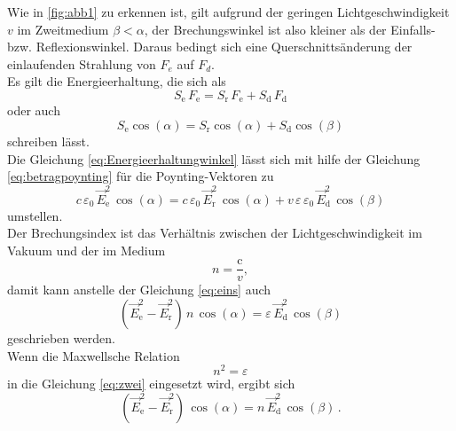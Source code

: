 Wie in \autoref{fig:abb1} zu erkennen ist, gilt aufgrund der geringen Lichtgeschwindigkeit $v$ im Zweitmedium $\beta < \alpha$, der Brechungswinkel ist also kleiner als der Einfalls- bzw. Reflexionswinkel.
Daraus bedingt sich eine Querschnittsänderung der einlaufenden Strahlung von $F_e$ auf $F_d$. \\

Es gilt die Energieerhaltung, die sich als
\begin{equation}
    S_{\text{e}} \, F_{\text{e}} = S_{\text{r}} \, F_{\text{e}} +  S_{\text{d}} \, F_{\text{d}}
    \label{eq:Energieerhaltung}
\end{equation}
oder auch 
\begin{equation}
    S_{\text{e}} \cos(\alpha) = S_{\text{r}} \cos(\alpha) +  S_{\text{d}} \cos(\beta)
    \label{eq:Energieerhaltungwinkel}
\end{equation}
schreiben lässt. \\

Die Gleichung \eqref{eq:Energieerhaltungwinkel} lässt sich mit hilfe der Gleichung \eqref{eq:betragpoynting} für die Poynting-Vektoren zu 
\begin{equation}
    c \, \varepsilon_0 \, \vec{E}^2_{\text{e}} \, \cos(\alpha) = c \, \varepsilon_0 \, \vec{E}^2_{\text{r}} \, \cos(\alpha) + v \, \varepsilon \, \varepsilon_0 \, \vec{E}^2_{\text{d}} \, \cos(\beta)
    \label{eq:eins}
\end{equation}
umstellen.\\

Der Brechungsindex ist das Verhältnis zwischen der Lichtgeschwindigkeit im Vakuum und der im Medium 
\begin{equation}
    n = \dfrac{\text{c}}{v} ,
    \label{eq:Brechungsindex}
\end{equation}
damit kann anstelle der Gleichung \eqref{eq:eins} auch
\begin{equation}
    (\vec{E}^2_{\text{e}}  - \vec{E}^2_{\text{r}}) \, n \, \cos(\alpha) = \varepsilon \, \vec{E}^2_{\text{d}} \, \cos(\beta)
    \label{eq:zwei}
\end{equation}
geschrieben werden. \\

Wenn die Maxwellsche Relation
\begin{equation*}
    n^2 = \varepsilon
    \label{eq:Maxwellschrelation}
\end{equation*}
in die Gleichung \eqref{eq:zwei} eingesetzt wird, ergibt sich 
\begin{equation}
    (\vec{E}^2_{\text{e}}  - \vec{E}^2_{\text{r}}) \, \cos(\alpha) = n \, \vec{E}^2_{\text{d}} \, \cos(\beta) \,.
    \label{eq:drei}
\end{equation}

